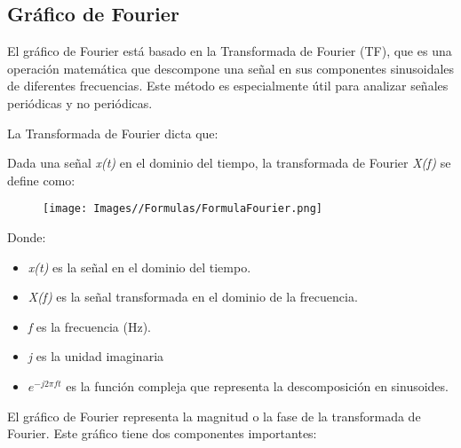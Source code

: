 \documentclass{article}
\begin{document}
\subsection{Gráfico de Fourier}
El gráfico de Fourier está basado en la Transformada de Fourier (TF), que es una operación matemática que descompone una señal en sus componentes sinusoidales de diferentes frecuencias. Este método es especialmente útil para analizar señales periódicas y no periódicas.

La Transformada de Fourier dicta que: 

Dada una señal \textit{x(t)} en el dominio del tiempo, la transformada de Fourier \textit{X(f)} se define como:

\begin{figure}[H]
    \centering
    \texttt{[image: Images//Formulas/FormulaFourier.png]}
\end{figure}

Donde:
\begin{itemize}
    \item \textit{x(t)} es la señal en el dominio del tiempo.
    \item \textit{X(f)} es la señal transformada en el dominio de la frecuencia.
    \item \textit{f} es la frecuencia (Hz).
    \item \textit{j} es la unidad imaginaria 
    \item $e^{-j2\pi ft}$ es la función compleja que representa la descomposición en sinusoides.

\end{itemize}

El gráfico de Fourier representa la magnitud o la fase de la transformada de Fourier. Este gráfico tiene dos componentes importantes:

\end{document}
